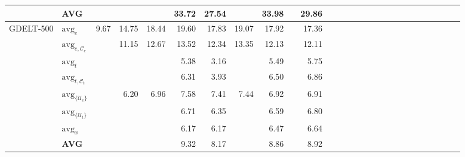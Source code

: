\begin{table*}[!t]
{\begin{tabular}{l l r r r r r r r r r r r r r r r r r r r r r r r r r}
                                  & \textbf{AVG}                      &                    &                &               & 33.72          & 27.54            &               & 33.98         &  & 29.86            \\  %
      \midrule
      \multirow{8}{*}{GDELT-500}  & $\text{avg}_{e} $                 & 9.67               & 14.75          & 18.44         & 19.60          & 17.83            & 19.07         & 17.92         &  & 17.36            \\  %
                                  & $\text{avg}_{e , \mathcal{C}_e}$  &                    & 11.15          & 12.67         & 13.52          & 12.34            & 13.35         & 12.13         &  & 12.11            \\  %
                                  & $\text{avg}_{t} $                 &                    &                &               & 5.38           & 3.16             &               & 5.49          &  & 5.75             \\  %
                                  & $\text{avg}_{t , \mathcal{C}_t}$  &                    &                &               & 6.31           & 3.93             &               & 6.50          &  & 6.86             \\  %
                                  & $\text{avg}_{\{\mathcal{U}_e\}}$  &                    & 6.20           & 6.96          & 7.58           & 7.41             & 7.44          & 6.92          &  & 6.91             \\  %
                                  & $\text{avg}_{\{\mathcal{U}_t\}}$  &                    &                &               & 6.71           & 6.35             &               & 6.59          &  & 6.80             \\  %
                                  & $\text{avg}_{x}$                  &                    &                &               & 6.17           & 6.17             &               & 6.47          &  & 6.64             \\  %
                                  & \textbf{AVG}                      &                    &                &               & 9.32           & 8.17             &               & 8.86          &  & 8.92             \\  %
      \bottomrule
    \end{tabular}
  }
  \vspace{-4mm}
\end{table*}


